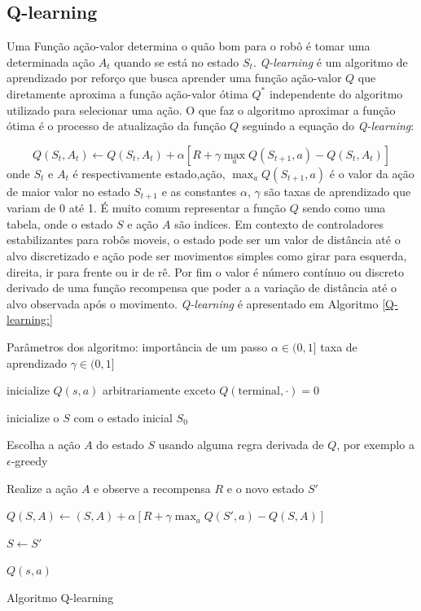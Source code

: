 \subsection{Q-learning}
Uma Função ação-valor determina o quão bom 
para o robô é tomar uma determinada ação $A_t$ quando se está no estado
$S_t$. \textit{Q-learning} é um algoritmo de aprendizado por reforço que
busca aprender uma função ação-valor $Q$ que diretamente aproxima
a função ação-valor ótima $Q^*$ independente do algoritmo utilizado
para selecionar uma ação. O que faz o algoritmo aproximar a função ótima
é o processo de atualização da função $Q$ seguindo a equação do \textit{Q-learning}:

\begin{equation} 
    Q(S_t,A_t) \leftarrow Q(S_t,A_t) + \alpha[R + \gamma  \max_aQ(S_{t +1},a) - Q(S_t,A_t)]
\end{equation}
onde $S_t$ e $A_t$ é respectivamente estado,ação, $\max_aQ(S_{t +1},a)$ é o valor da
ação de maior valor no estado $S_{t+1}$ e as constantes $\alpha$, $\gamma$ são taxas
de aprendizado que variam de 0 até 1. É muito comum representar a função $Q$
sendo como uma tabela, onde o estado $S$ e ação $A$ são indices. Em contexto de
controladores estabilizantes para robôs moveis, o estado pode ser um
valor de distância até o alvo discretizado e ação pode ser movimentos simples
como girar para esquerda, direita, ir para frente ou ir de rê. Por fim o valor é
número contínuo ou discreto derivado de uma função recompensa que poder
a a variação de distância até o alvo observada após o movimento.
\textit{Q-learning} é apresentado em Algoritmo  \ref{Q-learning:}


\begin{algorithm}[H]
    \label{Q-learning:}
    Parâmetros dos algoritmo: importância de um passo $\alpha \in (0,1]$
    taxa de aprendizado $\gamma \in (0,1] $

    
    
    inicialize $Q(s,a)$ arbitrariamente exceto $Q(\text{terminal},\cdot ) = 0$

     {
        inicialize o $S$ com o estado inicial $S_0$

        
         {
            Escolha a ação $A$ do estado $S$ usando alguma regra derivada de $Q$,
            por exemplo a $\epsilon$-greedy

            Realize a ação $A$ e observe a recompensa $R$ e o novo estado $S'$
            
            $Q(S,A) \leftarrow (S,A) + \alpha[R + \gamma \max_aQ(S',a) - Q(S,A)]$
            
            $S \leftarrow S'$


        }
        
    }
    \Retorna $Q(s,a)$
    \caption{Algoritmo Q-learning}
    
\end{algorithm}

